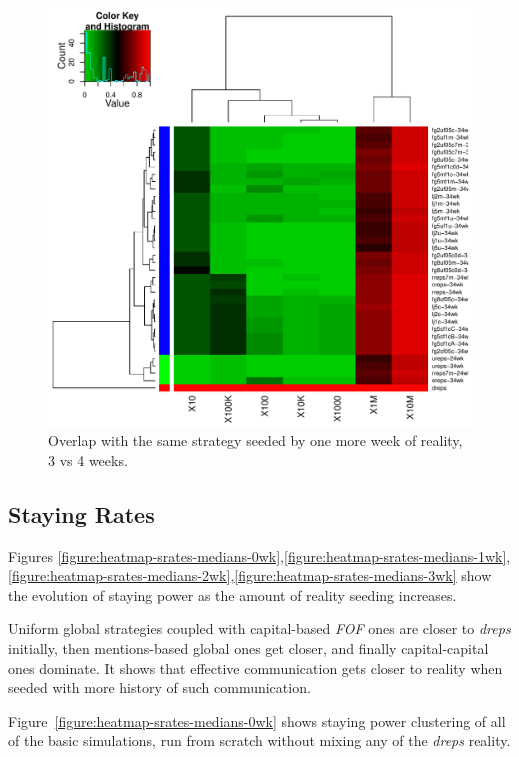 \documentclass[10pt,oneside]{memoir}
\begin{document}
\begin{Spacing}{2}
\begin{figure}
\begin{center}
    \includegraphics{figures/crop/heatmap-overx-self-medians-3wk}
    \caption{Overlap with the same strategy seeded by one more week of reality, 3 vs 4 weeks.}
    \label{figure:heatmap-overx-self-medians-3wk}
\end{center}
\end{figure}
\pagebreak \subsection{Staying Rates}
\label{stayingrates}

Figures \ref{figure:heatmap-srates-medians-0wk},\ref{figure:heatmap-srates-medians-1wk},\ref{figure:heatmap-srates-medians-2wk},\ref{figure:heatmap-srates-medians-3wk} show the evolution of staying power as the amount of reality seeding increases.  


Uniform global strategies coupled with capital-based {\itshape FOF} ones are closer to {\itshape dreps} initially, then mentions-based global ones get closer, and finally capital-capital ones dominate.  It shows that effective communication gets closer to reality when seeded with more history of such communication.


Figure~\ref{figure:heatmap-srates-medians-0wk} shows staying power clustering of all of the basic simulations, run from scratch without mixing any of the {\itshape dreps} reality.



\end{Spacing}
\end{document}
